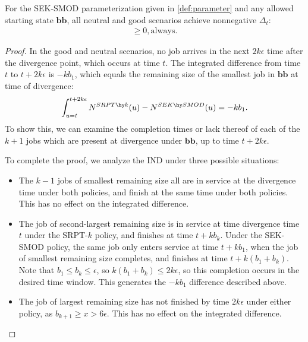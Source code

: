 \documentclass[acmsmall]{acmart}
\newcommand{\bb}{\boldsymbol{b}}
\newcommand{\bbb}{\bb\bb}
\newcommand{\good}{\textsc{Good}}
\newcommand{\neutral}{\textsc{Neutral}}
\begin{document}
\begin{lemma}
    \label{lem:neutral}
    For the SEK-SMOD parameterization given in \cref{def:parameter}
    and any allowed starting state $\bbb$,
    all neutral and good scenarios achieve nonnegative $\Delta_t$:
    \begin{align*}
        [\Delta_t \mid \bbb(t) = \bbb \,\&\, (\good_t \wedge \neutral_t)] \ge 0, \text{always.}
    \end{align*}
\end{lemma}
\begin{proof}
    In the good and neutral scenarios, no job arrives in the next $2k\epsilon$ time after the divergence point, which occurs at time $t$.
    The integrated difference from time $t$ to $t+2k\epsilon$ is $-kb_1$, which equals
    the remaining size of the smallest job in $\bbb$ at time of divergence:
    \begin{align}
        \label{eq:neutral-first-interval}
        \int_{u=t}^{t+2k\epsilon} N^{SRPT\hy k}(u) - N^{SEK \hy SMOD}(u) = -kb_1.
    \end{align}
    To show this, we can examine the completion times or lack thereof of each of the $k+1$
    jobs which are present at divergence under $\bbb$,
    up to time $t+2k\epsilon$. 

    To complete the proof, we analyze the IND under three possible situations:

\begin{itemize}
        \item The $k-1$ jobs of smallest remaining size all are in service at the divergence time under both policies, and finish at the same time under both policies.
        This has no effect on the integrated difference.
        \item The job of second-largest remaining size is in service at time divergence time $t$ under the SRPT-$k$ policy,
        and finishes at time $t+kb_k$.
        Under the SEK-SMOD policy, the same job only enters service at time $t+k b_1$,
        when the job of smallest remaining size completes,
        and finishes at time $t+k(b_1 + b_k)$. Note that $b_1 \le b_k \le \epsilon$, so $k(b_1 + b_k) \le 2k \epsilon$, so this completion occurs in the desired time window.
        This generates the $-kb_1$ difference described above.
        \item The job of largest remaining size has not finished by time $2k\epsilon$
        under either policy, as $b_{k+1} \ge x > 6\epsilon$.
        This has no effect on the integrated difference.
    \end{itemize}


\end{proof}
\end{document}
